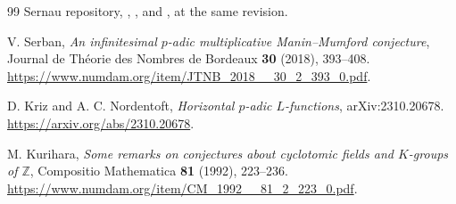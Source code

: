 \documentclass[11pt,letterpaper]{article}
\theoremstyle{remark}
\newcommand{\Z}{\mathbb Z}
\begin{document}
\begin{thebibliography}{99}
 Sernau repository, ,
, and
, at the same revision.

 V. Serban, \emph{An infinitesimal $p$-adic multiplicative
Manin--Mumford conjecture}, Journal de Th\'eorie des Nombres de Bordeaux
\textbf{30} (2018), 393--408.
\url{https://www.numdam.org/item/JTNB_2018__30_2_393_0.pdf}.

 D. Kriz and A. C. Nordentoft, \emph{Horizontal $p$-adic
$L$-functions}, arXiv:2310.20678.
\url{https://arxiv.org/abs/2310.20678}.

 M. Kurihara, \emph{Some remarks on conjectures about
cyclotomic fields and $K$-groups of $\Z$}, Compositio Mathematica
\textbf{81} (1992), 223--236.
\url{https://www.numdam.org/item/CM_1992__81_2_223_0.pdf}.
\end{thebibliography}
\end{document}
